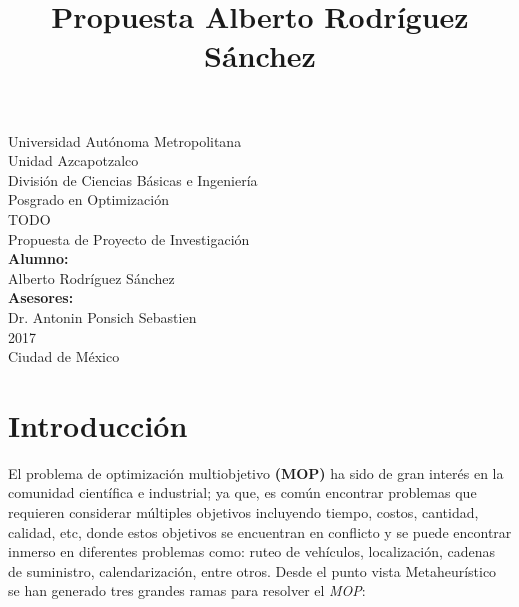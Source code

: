 \documentclass[letterpaper,10pt]{article}
\title{Propuesta Alberto Rodríguez Sánchez}
\begin{document}
\renewcommand{\refname}{Bibliografía}%
\thispagestyle{empty}

\begin{center}
    {\Huge Universidad Autónoma Metropolitana }\\
    {\huge Unidad Azcapotzalco}\\
    \vspace{0.5cm}
    {\Large División de Ciencias Básicas e Ingeniería}\\
    \vspace{1.0cm}
    {\large Posgrado en Optimización}\\
    \vspace{2.0cm}    
    {\Large TODO}\\
    \vspace{1.0cm}
    {\large Propuesta de Proyecto de Investigación}\\
    \vspace{2.0cm}
    {\large\textbf{Alumno:}}\\
    Alberto Rodríguez Sánchez\\
    \vspace{1.5cm}
    \bigskip
    {\large\textbf{Asesores:}}\\
    Dr. Antonin Ponsich Sebastien\\
    \vspace{1.5cm}
     2017\\
    \vspace{1.0cm}
    Ciudad de México\\
\end{center}
\newpage
\tableofcontents
\newpage
\section{Introducción}

El problema de optimización multiobjetivo \textbf{(MOP)} ha sido de gran interés en la comunidad científica e industrial; ya que, es común encontrar problemas que requieren considerar múltiples objetivos incluyendo tiempo, costos, cantidad, calidad, etc, donde estos objetivos se encuentran en conflicto y se puede encontrar inmerso en diferentes problemas como: ruteo de vehículos, localización, cadenas de suministro, calendarización, entre otros. Desde el punto vista Metaheurístico se han generado tres grandes ramas para resolver el \emph{MOP}:
\end{document}
